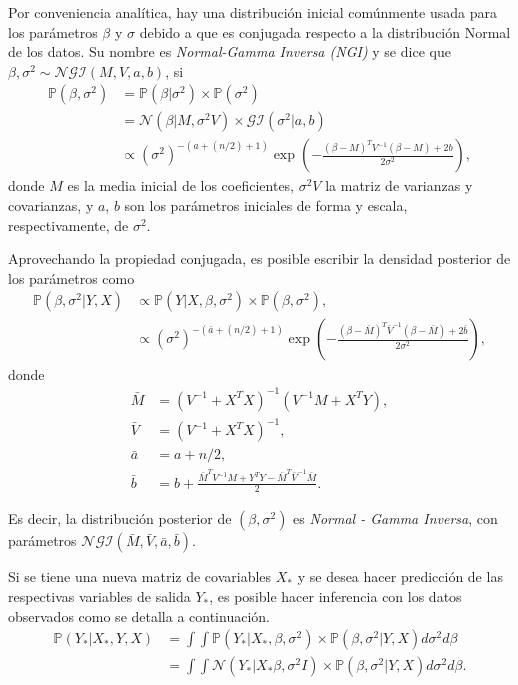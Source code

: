 Por conveniencia anal\'itica, hay una distribuci\'on inicial com\'unmente usada para los par\'ametros $\beta$ y $\sigma$ debido a que es conjugada respecto a la distribuci\'on Normal de los datos. Su nombre es \textit{Normal-Gamma Inversa (NGI)} y se dice que $\beta,\sigma^2 \sim \mathcal{NGI}(M,V,a,b)$, si
\begin{equation*}
\begin{aligned}
    \mathbb{P}(\beta,\sigma^2) 
    &= \mathbb{P}(\beta|\sigma^2) \times \mathbb{P}(\sigma^2) \\
    &= \mathcal{N}(\beta|M, \sigma^2 V) \times \mathcal{GI}(\sigma ^2|a,b) \\
    &\propto (\sigma^2)^{-(a+(n/2)+1)} \exp\left(-\frac{(\beta-M)^TV^{-1}(\beta-M) + 2b}{2\sigma^2}\right),
\end{aligned}
\end{equation*}
donde $M$ es la media inicial de los coeficientes, $\sigma^2 V$ la matriz de varianzas y covarianzas, y $a$, $b$ son los par\'ametros iniciales de forma y escala, respectivamente, de $\sigma ^2$. 

Aprovechando la propiedad conjugada, es posible escribir la densidad posterior de los par\'ametros como
\begin{equation*}
\begin{aligned}
    \mathbb{P}(\beta,\sigma^2 | Y, X) 
    &\propto \mathbb{P}(Y| X, \beta, \sigma^2) \times \mathbb{P}(\beta, \sigma^2), \\
    &\propto (\sigma^2)^{-(\bar{a}+(n/2)+1)} \exp\left(-\frac{(\beta-\bar{M})^T\bar{V}^{-1}(\beta-\bar{M}) + 2\bar{b}}{2\sigma^2}\right),
\end{aligned}
\end{equation*}
donde
\begin{equation*}
\begin{aligned}
    \bar{M} &= (V^{-1} + X^TX)^{-1} (V^{-1}M + X^TY), \\
    \bar{V} &= (V^{-1} + X^TX)^{-1}, \\
    \bar{a} &= a + n/2, \\
    \bar{b} &= b + \frac{\bar{M}^TV^{-1}M + Y^TY - \bar{M}^T\bar{V}^{-1}\bar{M}}{2}.
\end{aligned}
\end{equation*}

Es decir, la distribuci\'on posterior de $(\beta,\sigma^2)$ es \textit{Normal - Gamma Inversa}, con par\'ametros $\mathcal{NGI}(\bar{M},\bar{V},\bar{a},\bar{b})$.

Si se tiene una nueva matriz de covariables $X_*$ y se desea hacer predicci\'on de las respectivas variables de salida $Y_*$, es posible hacer inferencia con los datos observados como se detalla a continuaci\'on.
\begin{equation*}
\begin{aligned}
    \mathbb{P}(Y_*|X_*,Y,X)
    &= \int \int \mathbb{P}(Y_*|X_*,\beta,\sigma^2) \times \mathbb{P}(\beta,\sigma^2|Y,X) d\sigma^2 d\beta \\
    &= \int \int \mathcal{N}(Y_*|X_*\beta,\sigma^2I) \times \mathbb{P}(\beta,\sigma^2|Y,X) d\sigma^2 d\beta.
\end{aligned}
\end{equation*}

